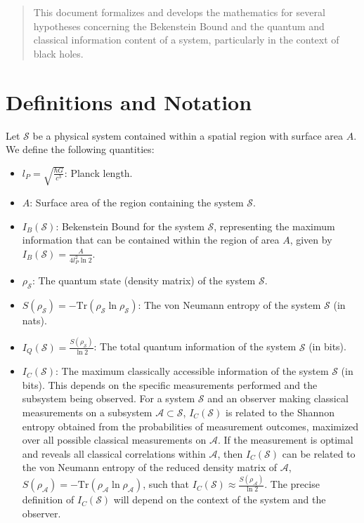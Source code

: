 	
	
	\begin{abstract}
		This document formalizes and develops the mathematics for several hypotheses concerning the Bekenstein Bound and the quantum and classical information content of a system, particularly in the context of black holes.
	\end{abstract}
	
	\section{Definitions and Notation}
	
	Let $\mathcal{S}$ be a physical system contained within a spatial region with surface area $A$. We define the following quantities:
	\begin{itemize}
		\item $l_P = \sqrt{\frac{\hbar G}{c^3}}$: Planck length.
		\item $A$: Surface area of the region containing the system $\mathcal{S}$.
		\item $I_B(\mathcal{S})$: Bekenstein Bound for the system $\mathcal{S}$, representing the maximum information that can be contained within the region of area $A$, given by $I_B(\mathcal{S}) = \frac{A}{4 l_P^2 \ln 2}$.
		\item $\rho_{\mathcal{S}}$: The quantum state (density matrix) of the system $\mathcal{S}$.
		\item $S(\rho_{\mathcal{S}}) = -\text{Tr}(\rho_{\mathcal{S}} \ln \rho_{\mathcal{S}})$: The von Neumann entropy of the system $\mathcal{S}$ (in nats).
		\item $I_Q(\mathcal{S}) = \frac{S(\rho_{\mathcal{S}})}{\ln 2}$: The total quantum information of the system $\mathcal{S}$ (in bits).
		\item $I_C(\mathcal{S})$: The maximum classically accessible information of the system $\mathcal{S}$ (in bits). This depends on the specific measurements performed and the subsystem being observed. For a system $\mathcal{S}$ and an observer making classical measurements on a subsystem $\mathcal{A} \subset \mathcal{S}$, $I_C(\mathcal{S})$ is related to the Shannon entropy obtained from the probabilities of measurement outcomes, maximized over all possible classical measurements on $\mathcal{A}$. If the measurement is optimal and reveals all classical correlations within $\mathcal{A}$, then $I_C(\mathcal{S})$ can be related to the von Neumann entropy of the reduced density matrix of $\mathcal{A}$, $S(\rho_{\mathcal{A}}) = -\text{Tr}(\rho_{\mathcal{A}} \ln \rho_{\mathcal{A}})$, such that $I_C(\mathcal{S}) \approx \frac{S(\rho_{\mathcal{A}})}{\ln 2}$. The precise definition of $I_C(\mathcal{S})$ will depend on the context of the system and the observer.
	\end{itemize}
	
